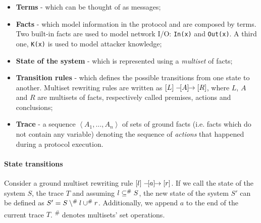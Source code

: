 \lstset{language=tamarin}
\begin{itemize}
    \item{\textbf{Terms} - which can be thought of as messages;}
    \item{\textbf{Facts} - which model information in the protocol and are composed by terms. Two built-in facts are used to model network I/O: \lstinline{In(x)} and \lstinline{Out(x)}. A third one, \lstinline{K(x)} is used to model attacker knowledge;}
    \item{\textbf{State of the system} - which is represented using a \textit{multiset} of facts;}
    \item{\textbf{Transition rules} - which defines the possible transitions from one state to another. Multiset rewriting rules are written as $\left[L\right] \mathrel{-\hspace{-2pt}[A]\hspace{-4pt}\to} \left[R\right]$, where $L$, $A$ and $R$ are multisets of facts, respectively called premises, actions and conclusions;}
    \item{\textbf{Trace} - a sequence $\left<A_1, \dots, A_n\right>$ of sets of ground facts (i.e. facts which do not contain any variable) denoting the sequence of \textit{actions} that happened during a protocol execution.}
\end{itemize}

\paragraph{State transitions}
Consider a ground multiset rewriting rule $\left[l\right] \mathrel{-\hspace{-2pt}[a]\hspace{-4pt}\to} \left[r\right]$. If we call the state of the system $S$, the trace $T$ and assuming $l \subseteq^\# S$, the new state of the system $S'$ can be defined as $S' = S \setminus^\# l \cup^\# r$. Additionally, we append $a$ to the end of the current trace $T$. \textsuperscript{\#} denotes multisets' set operations.





